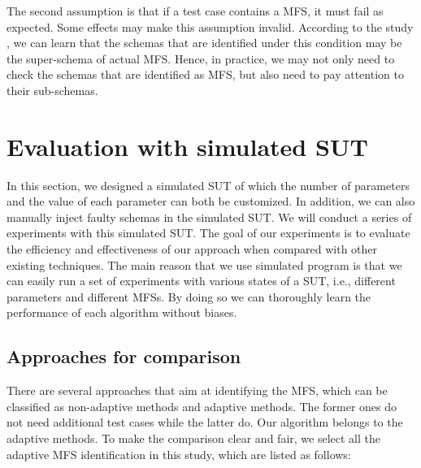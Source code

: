 \documentclass{sig-alternate-05-2015}
\begin{document}
{{{The second assumption is that if a test case contains a MFS, it must fail as expected. Some effects \cite{Masri:2014:PCC:2582050.2559932,yilmaz2013reducing} may make this assumption invalid. According to the study \cite{zhang2011characterizing}, we can learn that the schemas that are identified under this condition may be the super-schema of actual MFS. Hence, in practice, we may not only need to check the schemas that are identified as MFS, but also need to pay attention to their sub-schemas.

\section{Evaluation with simulated SUT} \label{sec:simulateEx}
In this section, we designed a simulated SUT of which the number of parameters and the value of each parameter can both be customized. In addition, we can also manually inject faulty schemas in the simulated SUT. We will conduct a series of experiments with this simulated SUT. The goal of our experiments is to evaluate the efficiency and effectiveness of our approach when compared with other existing techniques. The main reason that we use simulated program is that we can easily run a set of experiments with various states of a SUT, i.e., different parameters and different MFSs. By doing so we can thoroughly learn the performance of each algorithm without biases.

\subsection{Approaches for comparison}
There are several approaches that aim at identifying the MFS, which can be classified as non-adaptive methods and adaptive methods. The former ones do not need additional test cases while the latter do. Our algorithm belongs to the adaptive methods. To make the comparison clear and fair, we select all the adaptive MFS identification in this study, which are listed as follows:

}}}
\end{document}
